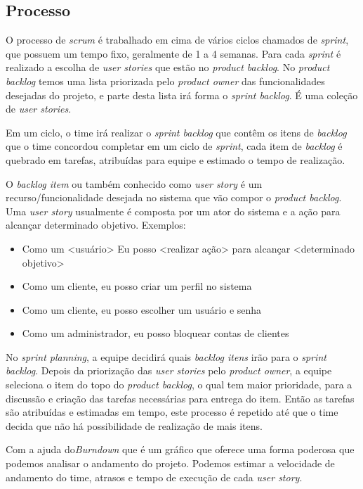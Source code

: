 \documentclass{abnt}
\begin{document}
		\subsection{Processo}
		
			O processo de \emph{scrum} é trabalhado em cima de vários ciclos chamados de \emph{sprint}, que possuem um tempo fixo, geralmente de
			1 a 4 semanas. Para cada \emph{sprint} é realizado a escolha de \emph{user stories} que estão no \emph{product backlog}. No \emph{product backlog} temos uma lista priorizada 
			pelo \emph{product owner} das funcionalidades desejadas do projeto, e parte desta lista irá forma o \emph{sprint backlog}. É uma coleção de \emph{user stories}.
			
			Em um ciclo, o time irá realizar o \emph{sprint backlog} que contêm os itens de \emph{backlog} que o time concordou 
			completar em um ciclo de \emph{sprint}, cada item de \emph{backlog} é quebrado em tarefas, atribuídas para equipe e estimado o tempo de realização.
			
					
			O \emph{backlog item} ou também conhecido como \emph{user story} é um recurso/funcionalidade desejada no sistema que vão compor o
			\emph{product backlog}. Uma \emph{user story} usualmente é composta por um ator do sistema e a ação para alcançar determinado
			objetivo. Exemplos: 
				\begin{itemize}
					\item Como um <usuário> Eu posso <realizar ação> para alcançar <determinado objetivo>
					\item Como um cliente, eu posso criar um perfil no sistema
					\item Como um cliente, eu posso escolher um usuário e senha
					\item Como um administrador, eu posso bloquear contas de clientes
				\end{itemize}
					 
					
			No \emph{sprint planning}, a equipe decidirá quais \emph{backlog itens} irão para o \emph{sprint backlog}. Depois da priorização das \emph{user
			stories} pelo \emph{product owner}, a equipe seleciona o item do topo do \emph{product backlog}, o qual tem maior prioridade, para a
			discussão e criação das tarefas necessárias para entrega do item. Então as tarefas são atribuídas e estimadas em
			tempo, este processo é repetido até que o time decida que não há possibilidade de realização de mais itens.
			
			Com a ajuda do\emph{Burndown} que é um gráfico que oferece uma forma poderosa que podemos analisar o andamento do projeto. Podemos estimar a velocidade de andamento do time, atrasos e tempo de 
			execução de cada \emph{user story}.
			
\end{document}
